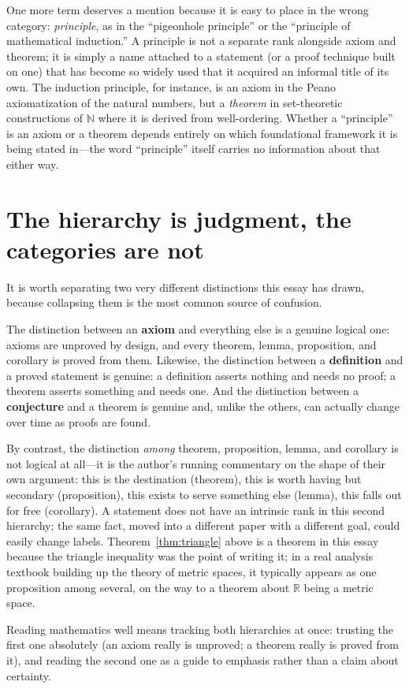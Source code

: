 \documentclass{essay}
\begin{document}
One more term deserves a mention because it is easy to place in the wrong category: \emph{principle}, as in the ``pigeonhole principle'' or the ``principle of mathematical induction.'' A principle is not a separate rank alongside axiom and theorem; it is simply a name attached to a statement (or a proof technique built on one) that has become so widely used that it acquired an informal title of its own. The induction principle, for instance, is an axiom in the Peano axiomatization of the natural numbers, but a \emph{theorem} in set-theoretic constructions of \(\mathbb{N}\) where it is derived from well-ordering. Whether a ``principle'' is an axiom or a theorem depends entirely on which foundational framework it is being stated in---the word ``principle'' itself carries no information about that either way.

\section{The hierarchy is judgment, the categories are not}

It is worth separating two very different distinctions this essay has drawn, because collapsing them is the most common source of confusion.

The distinction between an \textbf{axiom} and everything else is a genuine logical one: axioms are unproved by design, and every theorem, lemma, proposition, and corollary is proved from them. Likewise, the distinction between a \textbf{definition} and a proved statement is genuine: a definition asserts nothing and needs no proof; a theorem asserts something and needs one. And the distinction between a \textbf{conjecture} and a theorem is genuine and, unlike the others, can actually change over time as proofs are found.

By contrast, the distinction \emph{among} theorem, proposition, lemma, and corollary is not logical at all---it is the author's running commentary on the shape of their own argument: this is the destination (theorem), this is worth having but secondary (proposition), this exists to serve something else (lemma), this falls out for free (corollary). A statement does not have an intrinsic rank in this second hierarchy; the same fact, moved into a different paper with a different goal, could easily change labels. Theorem~\ref{thm:triangle} above is a theorem in this essay because the triangle inequality was the point of writing it; in a real analysis textbook building up the theory of metric spaces, it typically appears as one proposition among several, on the way to a theorem about \(\mathbb{R}\) being a metric space.

Reading mathematics well means tracking both hierarchies at once: trusting the first one absolutely (an axiom really is unproved; a theorem really is proved from it), and reading the second one as a guide to emphasis rather than a claim about certainty.
\end{document}
